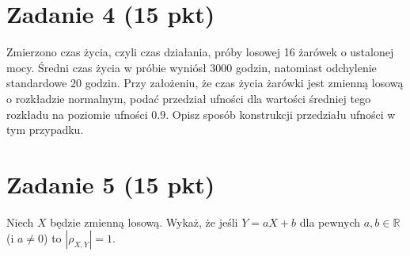 \documentclass[polish, 10pt]{extarticle}
\begin{document}
\section*{Zadanie 4 (15 pkt)}
Zmierzono czas życia, czyli czas działania, próby losowej 16 żarówek o ustalonej mocy. 
Średni czas życia w próbie wyniósł \( 3000 \) godzin, natomiast odchylenie standardowe \( 20 \) godzin. 
Przy założeniu, że czas życia żarówki jest zmienną losową o rozkładzie normalnym, podać przedział ufności dla wartości średniej tego rozkładu na poziomie ufności \( 0.9 \). Opisz sposób konstrukcji przedziału ufności w tym przypadku.

\section*{Zadanie 5 (15 pkt)}
Niech $X$ będzie zmienną losową. Wykaż, że jeśli $Y = aX + b$ dla pewnych $a, b \in \mathbb{R}$ (i $a \neq 0$) to $|\rho_{X,Y}| = 1$.
\end{document}
